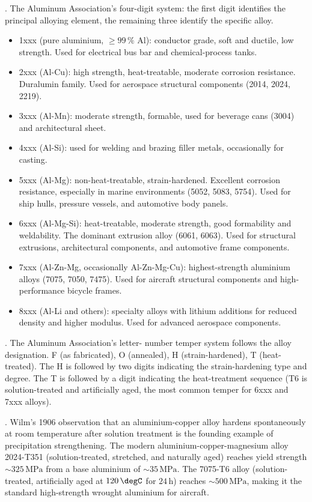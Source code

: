 . The Aluminum Association's
four-digit system: the first digit identifies the principal alloying
element, the remaining three identify the specific alloy.

\begin{itemize}[leftmargin=*]
\item 1xxx (pure aluminium, $\geq 99\,\%$ Al): conductor grade, soft
  and ductile, low strength. Used for electrical bus bar and
  chemical-process tanks.
\item 2xxx (Al-Cu): high strength, heat-treatable, moderate corrosion
  resistance. Duralumin family. Used for aerospace structural
  components (2014, 2024, 2219).
\item 3xxx (Al-Mn): moderate strength, formable, used for beverage
  cans (3004) and architectural sheet.
\item 4xxx (Al-Si): used for welding and brazing filler metals,
  occasionally for casting.
\item 5xxx (Al-Mg): non-heat-treatable, strain-hardened. Excellent
  corrosion resistance, especially in marine environments (5052,
  5083, 5754). Used for ship hulls, pressure vessels, and automotive
  body panels.
\item 6xxx (Al-Mg-Si): heat-treatable, moderate strength, good
  formability and weldability. The dominant extrusion alloy
  (6061, 6063). Used for structural extrusions, architectural
  components, and automotive frame components.
\item 7xxx (Al-Zn-Mg, occasionally Al-Zn-Mg-Cu): highest-strength
  aluminium alloys (7075, 7050, 7475). Used for aircraft structural
  components and high-performance bicycle frames.
\item 8xxx (Al-Li and others): specialty alloys with lithium
  additions for reduced density and higher modulus. Used for advanced
  aerospace components.
\end{itemize}

. The Aluminum Association's letter-
number temper system follows the alloy designation. F (as fabricated),
O (annealed), H (strain-hardened), T (heat-treated). The H is
followed by two digits indicating the strain-hardening type and
degree. The T is followed by a digit indicating the heat-treatment
sequence (T6 is solution-treated and artificially aged, the most
common temper for 6xxx and 7xxx alloys).

. Wilm's 1906 observation that an
aluminium-copper alloy hardens spontaneously at room temperature
after solution treatment is the founding example of precipitation
strengthening. The modern aluminium-copper-magnesium alloy 2024-T351
(solution-treated, stretched, and naturally aged) reaches yield
strength $\sim 325\,\text{MPa}$ from a base aluminium of $\sim 35\,
\text{MPa}$. The 7075-T6 alloy (solution-treated, artificially aged
at $120\,\degC$ for $24\,\text{h}$) reaches $\sim 500\,\text{MPa}$,
making it the standard high-strength wrought aluminium for aircraft.

